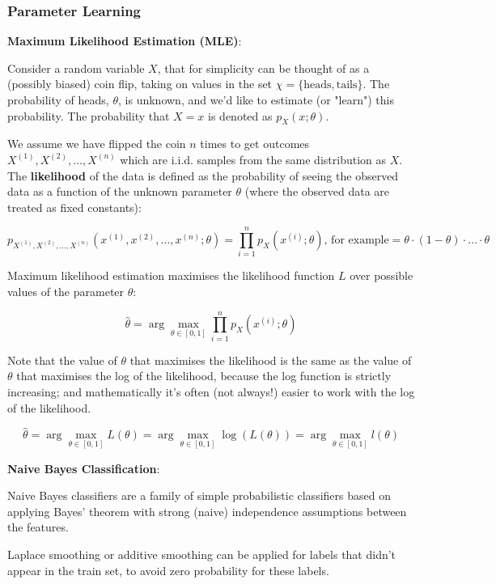\subsubsection{Parameter Learning}

\textbf{Maximum Likelihood Estimation (MLE)}:

Consider a random variable $X$, that for simplicity can be thought of as a (possibly biased) coin flip, taking on values in the set $\chi = \{ \text{heads}, \text{tails} \}$. The probability of heads, $\theta$, is unknown, and we'd like to estimate (or "learn") this probability. The probability that $X = x$ is denoted as $p_X(x; \theta)$.

We assume we have flipped the coin $n$ times to get outcomes $X^{(1)}, X^{(2)}, \dots, X^{(n)}$ which are i.i.d. samples from the same distribution as $X$. The \textbf{likelihood} of the data is defined as the probability of seeing the observed data as a function of the unknown parameter $\theta$ (where the observed data are treated as fixed constants):

$$
p_{X^{(1)}, X^{(2)}, \dots, X^{(n)}}(x^{(1)}, x^{(2)}, \dots, x^{(n)}; \theta) = \prod_{i=1}^n p_X(x^{(i)}; \theta) \text{, for example} = \theta \cdot (1 - \theta) \cdot \dots \cdot \theta
$$

Maximum likelihood estimation maximises the likelihood function $L$ over possible values of the parameter $\theta$:

$$
\hat{\theta} = \arg \max_{\theta \in [0, 1]} \prod_{i=1}^n p_X(x^{(i)}; \theta)
$$

Note that the value of $\theta$ that maximises the likelihood is the same as the value of $\theta$ that maximises the log of the likelihood, because the log function is strictly increasing; and mathematically it's often (not always!) easier to work with the log of the likelihood.

$$
\hat{\theta} = \arg \max_{\theta \in [0, 1]} L(\theta) = \arg \max_{\theta \in [0, 1]} \log(L(\theta)) = \arg \max_{\theta \in [0, 1]} l(\theta)
$$

\textbf{Naive Bayes Classification}:

Naive Bayes classifiers are a family of simple probabilistic classifiers based on applying Bayes' theorem with strong (naive) independence assumptions between the features.

Laplace smoothing or additive smoothing can be applied for labels that didn't appear in the train set, to avoid zero probability for these labels.

